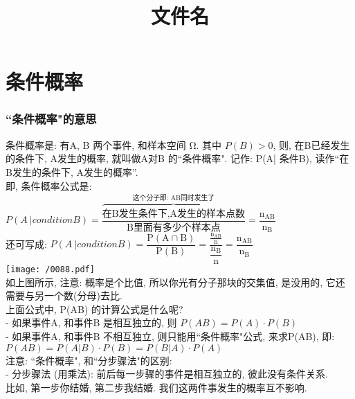 \documentclass[UTF8]{ctexart}
\title{文件名}
\begin{document}
	\tableofcontents %
	\date{} %
	\maketitle  %
	
	
	
	\part{条件概率}
	
	\section{``条件概率"的意思}
	
	条件概率是: 有A, B 两个事件, 和样本空间 Ω. 其中 $P(B) >0$, 则, 在B已经发生的条件下, A发生的概率, 就叫做A对B 的``条件概率". 记作:  P(A| 条件B), 读作``在B发生的条件下, A发生的概率”. \\
	
	即, 条件概率公式是: $
	P(A \ | condition B) =\dfrac{\overset{\text{这个分子即:\ AB同时发生了}}{\overbrace{\text{在B发生条件下,A发生的样本点数}}}}{\text{B里面有多少个样本点}}=\dfrac{\text{n}_{\text{AB}}}{\text{n}_{\text{B}}}
	$ \\
	
	还可写成:  $
	P(A \ | condition B) 
	=\dfrac{\text{P}\left( \text{A}\cap \text{B} \right)}{\text{P}\left( \text{B} \right)}
	=\dfrac{\frac{\text{n}_{\text{AB}}}{\text{n}}}{\dfrac{\text{n}_{\text{B}}}{\text{n}}}=\dfrac{\text{n}_{\text{AB}}}{\text{n}_{\text{B}}}
		$ \\
	
	\texttt{[image: /0088.pdf]} \\
	
	如上图所示, 注意: 概率是个比值, 所以你光有分子那块的交集值, 是没用的, 它还需要与另一个数(分母)去比. \\
	
	上面公式中, P(AB) 的计算公式是什么呢? \\
	- 如果事件A, 和事件B 是相互独立的, 则 $P(AB) = P(A) \cdot P(B)$ \\
	- 如果事件A, 和事件B 不相互独立, 则只能用``条件概率"公式, 来求P(AB), 即: $P(AB) = P(A |B) \cdot P(B) = P(B |A) \cdot P(A) $   \\
	
	
	
	注意: ``条件概率", 和``分步骤法"的区别: \\
	- 分步骤法 (用乘法): 前后每一步骤的事件是相互独立的, 彼此没有条件关系.  \\
	比如, 第一步你结婚, 第二步我结婚. 我们这两件事发生的概率互不影响. \\
	
\end{document}
